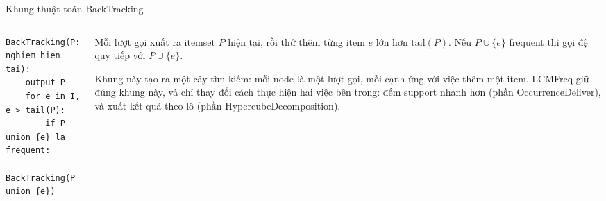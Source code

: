 \documentclass[9pt, aspectratio=169]{beamer}
\begin{document}
\begin{frame}[fragile]{Khung thuật toán BackTracking}
  \begin{columns}[T,onlytextwidth]
    \begin{column}{0.46\textwidth}
\begin{lstlisting}
BackTracking(P: nghiem hien tai):
    output P
    for e in I, e > tail(P):
        if P union {e} la frequent:
            BackTracking(P union {e})
\end{lstlisting}
    \end{column}
    \begin{column}{0.5\textwidth}
      \small
      Mỗi lượt gọi xuất ra itemset $P$ hiện tại, rồi thử thêm từng item $e$
      lớn hơn $\mathrm{tail}(P)$. Nếu $P\cup\{e\}$ frequent thì gọi đệ quy
      tiếp với $P\cup\{e\}$.

      \vspace{0.15cm}
      Khung này tạo ra một cây tìm kiếm: mỗi node là một lượt gọi, mỗi cạnh
      ứng với việc thêm một item. LCMFreq giữ đúng khung này, và chỉ thay
      đổi cách thực hiện hai việc bên trong: đếm support nhanh hơn (phần
      OccurrenceDeliver), và xuất kết quả theo lô (phần HypercubeDecomposition).
    \end{column}
  \end{columns}
\end{frame}
\end{document}
